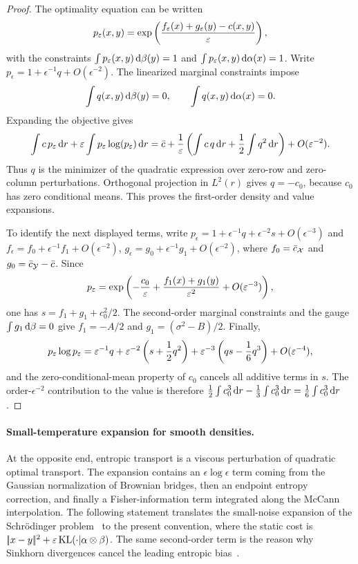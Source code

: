 \begin{proof}
	The optimality equation can be written
	\[
		p_\varepsilon(x,y)=\exp\left( \frac{f_\varepsilon(x)+g_\varepsilon(y)-c(x,y)}{\varepsilon} \right),
	\]
	with the constraints $\int p_\varepsilon(x,y)\,\mathrm{d}\beta(y)=1$ and $\int p_\varepsilon(x,y)\,\mathrm{d}\alpha(x)=1$. Write $p_\epsilon=1+\epsilon^{-1}q+O(\epsilon^{-2})$. The linearized marginal constraints impose
	\[
		\int q(x,y)\,\mathrm{d}\beta(y)=0,
		\qquad
		\int q(x,y)\,\mathrm{d}\alpha(x)=0.
	\]
	Expanding the objective gives
	\[
		\int c\,p_\varepsilon\,\mathrm{d} r+\varepsilon\int p_\varepsilon\log(p_\varepsilon)\,\mathrm{d} r
		=
		\bar c+\frac1{\varepsilon}
		\left( \int c\,q\,\mathrm{d} r+\frac12\int q^2\,\mathrm{d} r \right)
		+O(\varepsilon^{-2}).
	\]
	Thus $q$ is the minimizer of the quadratic expression over zero-row and zero-column perturbations. Orthogonal projection in $L^2(r)$ gives $q=-c_0$, because $c_0$ has zero conditional means. This proves the first-order density and value expansions.

	To identify the next displayed terms, write $p_\epsilon=1+\epsilon^{-1}q+\epsilon^{-2}s+O(\epsilon^{-3})$ and
	$f_\epsilon=f_0+\epsilon^{-1}f_1+O(\epsilon^{-2})$, $g_\epsilon=g_0+\epsilon^{-1}g_1+O(\epsilon^{-2})$, where $f_0=\bar c_{\mathcal{X}}$ and $g_0=\bar c_{\mathcal{Y}}-\bar c$. Since
	\[
		p_\varepsilon
		=
		\exp\left( -\frac{c_0}{\varepsilon}+\frac{f_1(x)+g_1(y)}{\varepsilon^2}+O(\varepsilon^{-3}) \right),
	\]
	one has $s=f_1+g_1+c_0^2/2$. The second-order marginal constraints and the gauge $\int g_1\,\mathrm{d}\beta=0$ give $f_1=-A/2$ and $g_1=(\sigma^2-B)/2$. Finally,
	\[
		p_\varepsilon\log p_\varepsilon
		=
		\varepsilon^{-1}q+\varepsilon^{-2}\left( s+\frac12 q^2 \right)
		+\varepsilon^{-3}\left( q s-\frac16 q^3 \right)+O(\varepsilon^{-4}),
	\]
	and the zero-conditional-mean property of $c_0$ cancels all additive terms in $s$. The order-$\epsilon^{-2}$ contribution to the value is therefore
	$\frac12\int c_0^3\,\mathrm{d} r-\frac13\int c_0^3\,\mathrm{d} r=\frac16\int c_0^3\,\mathrm{d} r$.
\end{proof}

\paragraph{Small-temperature expansion for smooth densities.}

At the opposite end, entropic transport is a viscous perturbation of quadratic optimal transport. The expansion contains an $\epsilon\log\epsilon$ term coming from the Gaussian normalization of Brownian bridges, then an endpoint entropy correction, and finally a Fisher-information term integrated along the McCann interpolation. The following statement translates the small-noise expansion of the Schr\"odinger problem~\cite{ConfortiTamanini2021EntropicDerivative} to the present convention, where the static cost is $|\!| x-y |\!|^2+\varepsilon\operatorname{KL}(\cdot|\alpha\otimes\beta)$. The same second-order term is the reason why Sinkhorn divergences cancel the leading entropic bias~\cite{ChizatRoussillonLegerVialardPeyre2020Sinkhorn}.

